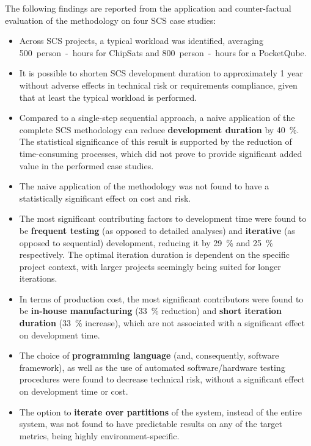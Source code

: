 \documentclass[a4paper,nobib,justified,final]{tufte-book}
\begin{document}
\begin{fullwidth}
The following findings are reported from the application and counter-factual evaluation of the methodology on four \acs{SCS} case studies:
\begin{itemize}[itemsep=-2pt]
	\item Across \acs{SCS} projects, a typical workload was identified, averaging \qty{500}{person-hours} for ChipSats and \qty{800}{person-hours} for a PocketQube.
	\item It is possible to shorten \acl{SCS} development duration to approximately 1 year without adverse effects in technical risk or requirements compliance, given that at least the typical workload is performed.
	\item Compared to a single-step sequential approach, a naive application of the complete \acs{SCS} methodology can reduce \textbf{development duration} by \qty{40}{\percent}. The statistical significance of this result is supported by the reduction of time-consuming processes, which did not prove to provide significant added value in the performed case studies.
	\item The naive application of the methodology was not found to have a statistically significant effect on cost and risk.
	\item The most significant contributing factors to development time were found to be \textbf{frequent testing} (as opposed to detailed analyses) and \textbf{iterative} (as opposed to sequential) development, reducing it by \qty{29}{\percent} and \qty{25}{\percent} respectively.
	The optimal iteration duration is dependent on the specific project context, with larger projects seemingly being suited for longer iterations.
	\item In terms of production cost, the most significant contributors were found to be \textbf{in-house manufacturing} (\qty{33}{\percent} reduction) and \textbf{short iteration duration} (\qty{33}{\percent} increase), which are not associated with a significant effect on development time.
	\item The choice of \textbf{programming language} (and, consequently, software framework), as well as the use of automated software/hardware testing procedures were found to decrease technical risk, without a significant effect on development time or cost.
	\item The option to \textbf{iterate over partitions} of the system, instead of the entire system, was not found to have predictable results on any of the target metrics, being highly environment-specific.
\end{itemize}


\end{fullwidth}
\end{document}

